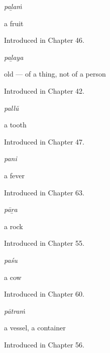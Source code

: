 \noindent\begin{minipage}[t]{\linewidth}
\raggedright
\textbf{}\enspace\emph{paḻaṁ}\par
\small a fruit\par
\footnotesize Introduced in Chapter 46.
\end{minipage}\par\medskip

\noindent\begin{minipage}[t]{\linewidth}
\raggedright
\textbf{}\enspace\emph{paḻaya}\par
\small old — of a thing, not of a person\par
\footnotesize Introduced in Chapter 42.
\end{minipage}\par\medskip

\noindent\begin{minipage}[t]{\linewidth}
\raggedright
\textbf{}\enspace\emph{pallŭ}\par
\small a tooth\par
\footnotesize Introduced in Chapter 47.
\end{minipage}\par\medskip

\noindent\begin{minipage}[t]{\linewidth}
\raggedright
\textbf{}\enspace\emph{pani}\par
\small a fever\par
\footnotesize Introduced in Chapter 63.
\end{minipage}\par\medskip

\noindent\begin{minipage}[t]{\linewidth}
\raggedright
\textbf{}\enspace\emph{pāṟa}\par
\small a rock\par
\footnotesize Introduced in Chapter 55.
\end{minipage}\par\medskip

\noindent\begin{minipage}[t]{\linewidth}
\raggedright
\textbf{}\enspace\emph{paśu}\par
\small a cow\par
\footnotesize Introduced in Chapter 60.
\end{minipage}\par\medskip

\noindent\begin{minipage}[t]{\linewidth}
\raggedright
\textbf{}\enspace\emph{pātraṁ}\par
\small a vessel, a container\par
\footnotesize Introduced in Chapter 56.
\end{minipage}\par\medskip

